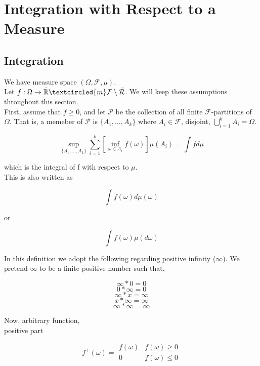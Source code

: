 \documentclass[11pt,fleqn]{book} %
\begin{document}


\chapter{Integration with Respect to a Measure}

\section{Integration}

We have measure space $(\Omega, \mathcal{F}, \mu)$.\\

Let $f: \Omega \rightarrow \bar{\mathbb{R}} \textcircled{m} \mathcal{F} \setminus \bar{\mathcal{R}}$. We will keep these assumptions throughout this section. \\


First, assume that $f \geq 0$, and let $\mathcal{P}$ be the collection of all finite $\mathcal{F}$-partitions of $\Omega$. That is, a memeber of $\mathcal{P}$ is $\{A_1, \dots, A_k\}$ where $A_i \in \mathcal{F}$, disjoint, $\bigcup^k_{i=1} A_i = \Omega$. 


		$$\sup_{\{A_1, \dots, A_k\}} \sum^k_{i=1} [\inf_{\omega \in A_i} f(\omega)] \mu(A_i) = \int f d\mu $$


which is the integral of f with respect to $\mu$. \\

This is also written as 	

		$$\int f(\omega) d\mu(\omega) $$

or 

		$$\int f(\omega) \mu(d\omega) $$

In this definition we adopt the following regarding positive infinity ($\infty$). We pretend $\infty$ to be a finite positive number such that, 

		$$\infty * 0 = 0 $$
		$$0 * \infty = 0 $$
		$$\infty * x = \infty $$
		$$x * \infty = \infty $$
		$$\infty * \infty = \infty $$

Now, arbitrary function, \\

positive part

		$$f^+(\omega) = \begin{array}{ll}
			f(\omega) & f(\omega) \geq 0\\
			0 & f(\omega) \leq 0
		\end{array} $$
\end{document}
